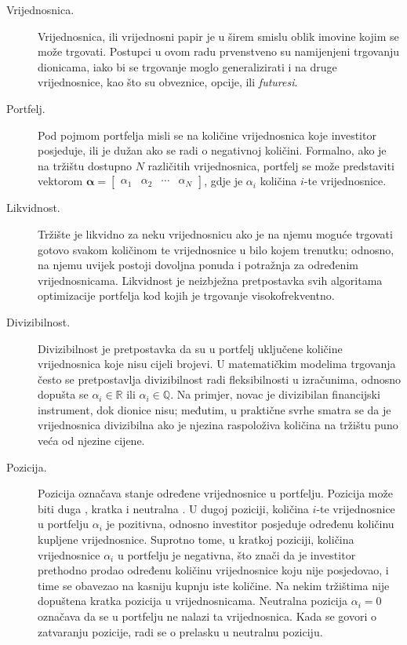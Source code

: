 \documentclass[lmodern, utf8, diplomski, numeric]{fer}
\newcommand{\matr}[1]{\mathbold{#1}}
\begin{document}
  \begin{description}
    \item[Vrijednosnica.] Vrijednosnica, ili vrijednosni papir  je u širem smislu oblik imovine kojim se može trgovati.
    Postupci u ovom radu prvenstveno su namijenjeni trgovanju dionicama, iako bi se trgovanje moglo generalizirati i na druge vrijednosnice, kao što su obveznice, opcije, ili \textit{futuresi}.
    
    \item[Portfelj.] Pod pojmom portfelja misli se na količine vrijednosnica koje investitor posjeduje, ili je dužan ako se radi o negativnoj količini.
    Formalno, ako je na tržištu dostupno $N$ različitih vrijednosnica, portfelj se može predstaviti vektorom $\matr{\alpha} = \begin{bmatrix} \alpha_1 & \alpha_2 & \cdots & \alpha_N \end{bmatrix}$, gdje je $\alpha_i$ količina $i$-te vrijednosnice.
    
    \item[Likvidnost.]
    Tržište je likvidno za neku vrijednosnicu ako je na njemu moguće trgovati gotovo svakom količinom te vrijednosnice u bilo kojem trenutku; odnosno, na njemu uvijek postoji dovoljna ponuda i potražnja za određenim vrijednosnicama.
    Likvidnost je neizbježna pretpostavka svih algoritama optimizacije portfelja kod kojih je trgovanje visokofrekventno.
    
    \item[Divizibilnost.]
    Divizibilnost je pretpostavka da su u portfelj uključene količine vrijednosnica koje nisu cijeli brojevi.
    U matematičkim modelima trgovanja često se pretpostavlja divizibilnost radi fleksibilnosti u izračunima, odnosno dopušta se $\alpha_i \in \mathbb{R}$ ili $\alpha_i \in \mathbb{Q}$.
    Na primjer, novac je divizibilan financijski instrument, dok dionice nisu; međutim, u praktične svrhe smatra se da je vrijednosnica divizibilna ako je njezina raspoloživa količina na tržištu puno veća od njezine cijene.
    
    \item[Pozicija.]
    Pozicija označava stanje određene vrijednosnice u portfelju.
    Pozicija može biti duga , kratka  i neutralna .
    U dugoj poziciji, količina $i$-te vrijednosnice u portfelju $\alpha_i$ je pozitivna, odnosno investitor posjeduje određenu količinu kupljene vrijednosnice.
    Suprotno tome, u kratkoj poziciji, količina vrijednosnice $\alpha_i$ u portfelju je negativna, što znači da je investitor prethodno prodao određenu količinu vrijednosnice koju nije posjedovao, i time se obavezao na kasniju kupnju iste količine.
    Na nekim tržištima nije dopuštena kratka pozicija u vrijednosnicama.
    Neutralna pozicija $\alpha_i = 0$ označava da se u portfelju ne nalazi ta vrijednosnica.
    Kada se govori o zatvaranju pozicije, radi se o prelasku u neutralnu poziciju.
    

\end{description}
\end{document}
